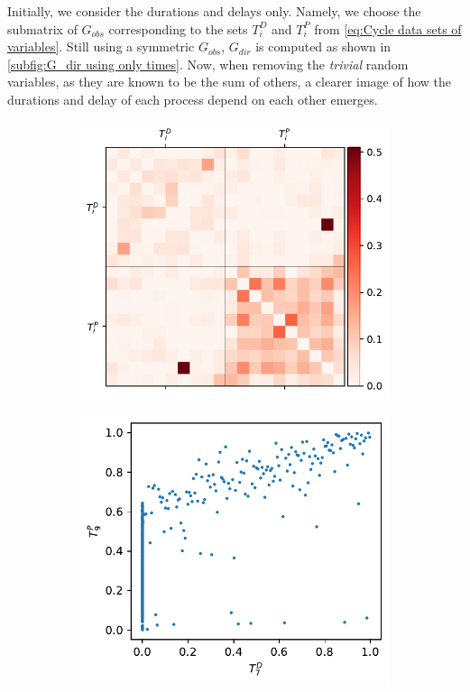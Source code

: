 \documentclass[../Thesis.tex]{subfiles}
\begin{document}
Initially, we consider the durations and delays only. Namely, we choose the submatrix of $G_{obs}$ corresponding to the sets $T^D_i$ and $T^P_i$ from \autoref{eq:Cycle data sets of variables}. Still using a symmetric $G_{obs}$, $G_{dir}$ is computed as shown in \autoref{subfig:G_dir using only times}. Now, when removing the \textit{trivial} random variables, as they are known to be the sum of others, a clearer image of how the durations and delay of each process depend on each other emerges.
\begin{figure}[ht]
    \centering
    \begin{subfigure}[t]{0.49\linewidth}
        \includegraphics[width = \linewidth]{figures/Cycle data/G_dir times - symmetric.pdf}
        \caption{}
        \label{subfig:G_dir using only times}
    \end{subfigure}
    \hfill
    \begin{subfigure}[t]{0.49\linewidth}
        \includegraphics[width=\linewidth]{figures/Cycle data/G_dir times - symmetric - TP9 vs TD7.pdf}

\end{subfigure}
\end{figure}
\end{document}
